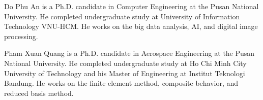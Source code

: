 \documentclass[journal]{IEEEtran}
\begin{document}








% 

\begin{IEEEbiography}{Do Phu An}
is a Ph.D. candidate in Computer Engineering at the Pusan National University. He completed undergraduate study at University of Information Technology VNU-HCM. He works on the big data analysis, AI, and digital image processing. 
\end{IEEEbiography}

\begin{IEEEbiography}{Pham Xuan Quang}
is a Ph.D. candidate in Aerospace Engineering at the Pusan National University. He completed undergraduate study at Ho Chi Minh City University of Technology and his Master of Engineering at Institut Teknologi Bandung. He works on the finite element method, composite behavior, and reduced basis method. 
\end{IEEEbiography}
\end{document}
